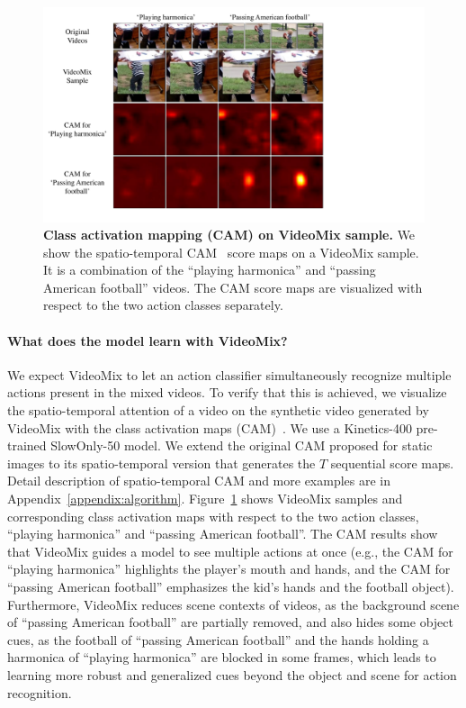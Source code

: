 \begin{figure}[!t]
\centering
\includegraphics[width=0.80\linewidth]{arxiv_videomix/main/figures/cam2.pdf}
\caption{\textbf{Class activation mapping (CAM) on VideoMix sample.} We show the spatio-temporal CAM~\cite{zhou2016CAM} score maps on a VideoMix sample. It is a combination of the ``playing harmonica'' and ``passing American football'' videos. The CAM score maps are visualized with respect to the two action classes separately. 
}
\label{fig:videomix:cam_visualize}
\end{figure}


\paragraph{What does the model learn with VideoMix?}

We expect VideoMix to let an action classifier simultaneously recognize multiple actions present in the mixed videos. To verify that this is achieved, we visualize the spatio-temporal attention of a video on the synthetic video generated by VideoMix with the class activation maps (CAM)~\cite{zhou2016CAM}.
We use a Kinetics-400 pre-trained SlowOnly-50 model. 
We extend the original CAM proposed for static images to its spatio-temporal version that generates the $T$ sequential score maps. 
Detail description of spatio-temporal CAM and more examples are in Appendix~\ref{appendix:algorithm}. 
Figure~\ref{fig:videomix:cam_visualize} shows VideoMix samples and corresponding class activation maps with respect to the two action classes, ``playing harmonica'' and ``passing American football''.
The CAM results show that VideoMix guides a model to see multiple actions at once (e.g., the CAM for ``playing harmonica'' highlights the player's mouth and hands, and the CAM for ``passing American football'' emphasizes the kid's hands and the football object).
Furthermore, VideoMix reduces scene contexts of videos, as the background scene of ``passing American football'' are partially removed, and also hides some object cues, as the football 
of ``passing American football'' and the hands holding a harmonica of ``playing harmonica'' are blocked in some frames, which leads to learning more robust and generalized cues beyond the object and scene for action recognition. 

